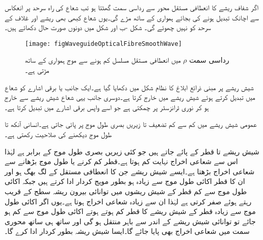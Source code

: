 اگر شفاف ریشے کا  انعطافی مستقل محور سے رداسی  سمت گھٹتا ہو تب شعاع کی راہ سرحد پر انعکاس سے اچانک تبدیل ہونے کی بجائے ہمواری کے ساتھ مڑے گی۔یوں شعاع کبھی بھی ریشے اور  غلاف کے سرحد کو نہیں چھوئے گی۔  شکل -ب اور شکل  میں دونوں صورت حال دکھائے ہیں۔  

\begin{figure}
\centering
\texttt{[image: figWaveguideOpticalFibreSmoothWave]}
\caption{رداسی سمت $\rho$ میں  انعطافی مستقل مسلسل کم ہونے سے موج ہمواری کے ساتھ مڑتی ہے۔}
\label{شکل_مویج_شیش_ریشہ_ہموار_موج}
\end{figure}

شیش ریشے پر مبنی ذرائع ابلاغ کا نظام شکل میں دکھایا گیا ہے۔ایک جانب  یا  برقی اشارے کو شعاع میں تبدیل کرتے ہوئے شیش ریشے میں خارج کرتا ہے۔دوسری جانب یہی شعاع شیش ریشے سے خارج ہو کر نوری ٹرانزسٹر پر چمکتی ہے جو اسے واپس برقی اشارے میں تبدیل کرتا ہے۔ 

عمومی شیش ریشے  میں کم سے کم تضعیف  تا  زیریں بصری طول موج پر پائی جاتی ہے۔انسانی آنکھ  تا  طول موج دیکھنے کی صلاحیت رکھتی ہے۔

شیش ریشے   تا  قطر کے پائے جاتے ہیں جو کئی زیریں بصری طول موج کے برابر ہے لہٰذا اس سے شعاعی اخراج نہایت کم ہوتا ہے۔قطر کم کرنے یا طول موج بڑھانے سے شعاعی اخراج بڑھتا ہے۔ایسے شیش ریشے جن کا  انعطافی مستقل  کے لگ بھگ ہو اور ان کا قطر اکائی طول موج سے زیادہ ہو بطور مویج کردار ادا کرتے ہیں جبکہ اکائی طول موج سے کم قطر  کے شیش ریشوں میں توانائی بیرون ریشہ سطح کے قریب رہتے ہوئے صفر کرتی ہے لہٰذا ان سے زیادہ شعاعی اخراج ہوتا ہے۔یوں اگر اکائی طول موج  سے زیادہ قطر کے شیش ریشے کا قطر کم ہوتے ہوتے اکائی طول موج سے کم ہو جائے تو توانائی شیش ریشے کے اندر سے  باہر  منتقل ہو گی  اور ساتھ ہی ساتھ محوری سمت میں شعاعی اخراج بھی پایا جائے گا۔ایسا شیش ریشہ بطور   کردار ادا کرے  گا۔

